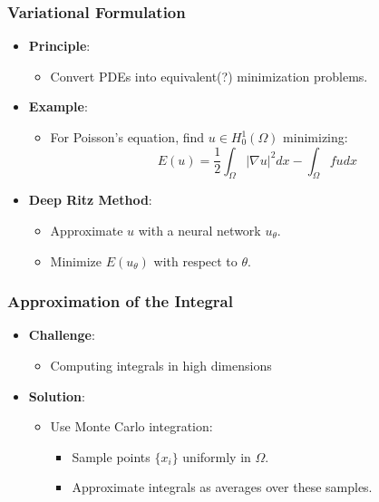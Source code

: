 \documentclass{beamer}
\begin{document}
\begin{frame}
  \frametitle{Variational Formulation}
  \begin{itemize}
    \item \textbf{Principle}:
      \begin{itemize}
        \item Convert PDEs into equivalent(?) minimization problems.
      \end{itemize}
    \item \textbf{Example}:
      \begin{itemize}
        \item For Poisson's equation, find \( u \in H^1_0(\Omega) \) minimizing:
          \[
          E(u) = \frac{1}{2} \int_\Omega |\nabla u|^2 dx - \int_\Omega fu dx
          \]
      \end{itemize}
    \item \textbf{Deep Ritz Method}:
      \begin{itemize}
        \item Approximate \( u \) with a neural network \( u_\theta \).
        \item Minimize \( E(u_\theta) \) with respect to \( \theta \).
      \end{itemize}
  \end{itemize}
\end{frame}

\begin{frame}
  \frametitle{Approximation of the Integral}
  \begin{itemize}
    \item \textbf{Challenge}:
      \begin{itemize}
        \item Computing integrals in high dimensions
      \end{itemize}
    \item \textbf{Solution}:
      \begin{itemize}
        \item Use Monte Carlo integration:
          \begin{itemize}
            \item Sample points \( \{x_i\} \) uniformly in \( \Omega \).
            \item Approximate integrals as averages over these samples.
          \end{itemize}
      \end{itemize}
  \end{itemize}
\end{frame}
\end{document}
